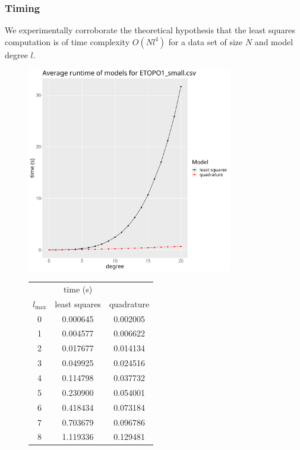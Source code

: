 \documentclass[a4paper]{article}
\theoremstyle{definition}
\begin{document}
\subsubsection{Timing}


We experimentally corroborate the theoretical hypothesis that the least squares computation is of time complexity $O(Nl^4)$ for a data set of size $N$ and 
model degree $l$.
\begin{figure}[h!]
\begin{minipage}{0.7\linewidth}
    \centering
    \includegraphics[width=0.8\textwidth]{media/average_runtime.png}
\end{minipage}
\begin{minipage}{0.28\linewidth}
\begin{tabular}{c | c c}
     & time (s) & \\
    $l_{\mathrm{max}}$ & least squares & quadrature \\
    \hline
    0 & 0.000645 & 0.002005 \\
    1 & 0.004577 & 0.006622 \\
    2 & 0.017677 & 0.014134 \\
    3 & 0.049925 & 0.024516 \\
    4 & 0.114798 & 0.037732 \\
    5 & 0.230900 & 0.054001 \\
    6 & 0.418434 & 0.073184 \\
    7 & 0.703679 & 0.096786 \\
    8 & 1.119336 & 0.129481 \\

\end{tabular}
\end{minipage}
\end{figure}
\end{document}
